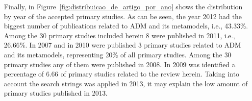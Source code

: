 Finally, in Figure~\ref{fig:distribuicao_de_artigo_por_ano} shows the distribution by year of the accepted primary studies. As can be seen, the year 2012 had the biggest number of publications related to ADM and its metamodels, i.e., 43.33\%. Among the 30 primary studies included herein 8 were published in 2011, i.e., 26.66\%. In 2007 and in 2010 were published 3 primary studies related to ADM and its metamodels, representing 20\% of all primary studies. Among the 30 primary studies any of them were published in 2008. In 2009 was identified a percentage of 6.66 of primary studies related to the review herein. Taking into account the search strings was applied in 2013, it may explain the low amount of primary studies published in 2013. 



